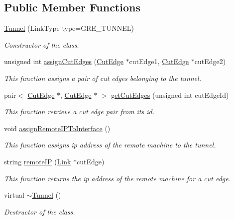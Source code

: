 \subsection*{\-Public \-Member \-Functions}
\begin{DoxyCompactItemize}
\item 
\hyperlink{classTunnel_a8f3c32f64244b115fd97e01b6835b697}{\-Tunnel} (\-Link\-Type type=\-G\-R\-E\-\_\-\-T\-U\-N\-N\-E\-L)
\begin{DoxyCompactList}\small\item\em \-Constructor of the class. \end{DoxyCompactList}\item 
unsigned int \hyperlink{classTunnel_ac8e7855c35b716b18d118e6f042fe50e}{assign\-Cut\-Edges} (\hyperlink{classCutEdge}{\-Cut\-Edge} $\ast$cut\-Edge1, \hyperlink{classCutEdge}{\-Cut\-Edge} $\ast$cut\-Edge2)
\begin{DoxyCompactList}\small\item\em \-This function assigns a pair of cut edges belonging to the tunnel. \end{DoxyCompactList}\item 
pair$<$ \hyperlink{classCutEdge}{\-Cut\-Edge} $\ast$, \hyperlink{classCutEdge}{\-Cut\-Edge} $\ast$ $>$ \hyperlink{classTunnel_afd42e503516f86e0a62178954cfe1cea}{get\-Cut\-Edges} (unsigned int cut\-Edge\-Id)
\begin{DoxyCompactList}\small\item\em \-This function retrieve a cut edge pair from its id. \end{DoxyCompactList}\item 
\hypertarget{classTunnel_adbeb60c73c3be196ddaee4be636fa7ea}{void \hyperlink{classTunnel_adbeb60c73c3be196ddaee4be636fa7ea}{assign\-Remote\-I\-P\-To\-Interface} ()}\label{classTunnel_adbeb60c73c3be196ddaee4be636fa7ea}

\begin{DoxyCompactList}\small\item\em \-This function assigns ip address of the remote machine to the tunnel. \end{DoxyCompactList}\item 
string \hyperlink{classTunnel_a56e75095090a1af93d98ed70f0c08994}{remote\-I\-P} (\hyperlink{classLink}{\-Link} $\ast$cut\-Edge)
\begin{DoxyCompactList}\small\item\em \-This function returns the ip address of the remote machine for a cut edge. \end{DoxyCompactList}\item 
\hypertarget{classTunnel_aceb2db22decfea9cb030e6a8a0304907}{virtual \hyperlink{classTunnel_aceb2db22decfea9cb030e6a8a0304907}{$\sim$\-Tunnel} ()}\label{classTunnel_aceb2db22decfea9cb030e6a8a0304907}

\begin{DoxyCompactList}\small\item\em \-Destructor of the class. \end{DoxyCompactList}\end{DoxyCompactItemize}
